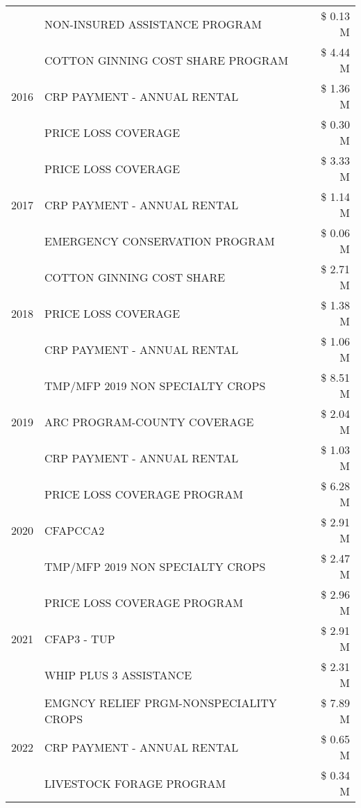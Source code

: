 \begin{tabular}{llr}
 & NON-INSURED ASSISTANCE PROGRAM & \$ 0.13 M \\
\cline{1-3}
\multirow[t]{3}{*}{2016} & COTTON GINNING COST SHARE PROGRAM & \$ 4.44 M \\
 & CRP PAYMENT - ANNUAL RENTAL & \$ 1.36 M \\
 & PRICE LOSS COVERAGE & \$ 0.30 M \\
\cline{1-3}
\multirow[t]{3}{*}{2017} & PRICE LOSS COVERAGE & \$ 3.33 M \\
 & CRP PAYMENT - ANNUAL RENTAL & \$ 1.14 M \\
 & EMERGENCY CONSERVATION PROGRAM & \$ 0.06 M \\
\cline{1-3}
\multirow[t]{3}{*}{2018} & COTTON GINNING COST SHARE & \$ 2.71 M \\
 & PRICE LOSS COVERAGE & \$ 1.38 M \\
 & CRP PAYMENT - ANNUAL RENTAL & \$ 1.06 M \\
\cline{1-3}
\multirow[t]{3}{*}{2019} & TMP/MFP 2019 NON SPECIALTY CROPS & \$ 8.51 M \\
 & ARC PROGRAM-COUNTY COVERAGE & \$ 2.04 M \\
 & CRP PAYMENT - ANNUAL RENTAL & \$ 1.03 M \\
\cline{1-3}
\multirow[t]{3}{*}{2020} & PRICE LOSS COVERAGE PROGRAM & \$ 6.28 M \\
 & CFAPCCA2 & \$ 2.91 M \\
 & TMP/MFP 2019 NON SPECIALTY CROPS & \$ 2.47 M \\
\cline{1-3}
\multirow[t]{3}{*}{2021} & PRICE LOSS COVERAGE PROGRAM & \$ 2.96 M \\
 & CFAP3 - TUP & \$ 2.91 M \\
 & WHIP PLUS 3 ASSISTANCE & \$ 2.31 M \\
\cline{1-3}
\multirow[t]{3}{*}{2022} & EMGNCY RELIEF PRGM-NONSPECIALITY CROPS & \$ 7.89 M \\
 & CRP PAYMENT - ANNUAL RENTAL & \$ 0.65 M \\
 & LIVESTOCK FORAGE PROGRAM & \$ 0.34 M \\
\cline{1-3}
\bottomrule
\end{tabular}
